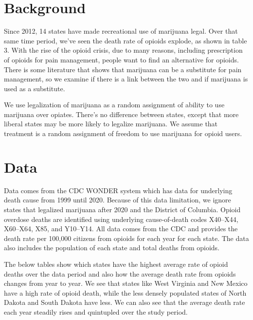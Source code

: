 \documentclass{article}
\begin{document}
\section*{Background} %

Since 2012, 14 states have made recreational use of marijuana legal. Over that same time period, we've seen the death rate of opioids explode, as shown in table 3. With the rise of the opioid crisis, due to many reasons, including prescription of opioids for pain management, people want to find an alternative for opioids. There is some literature that shows that marijuana can be a substitute for pain management, so we examine if there is a link between the two and if marijuana is used as a substitute. 

We use legalization of marijuana as a random assignment of ability to use marijuana over opiates. There's no difference between states, except that more liberal states may be more likely to legalize marijuana. We assume that treatment is a random assignment of freedom to use marijuana for opioid users. 





\section*{Data} %

Data comes from the CDC WONDER system which has data for underlying death cause from 1999 until 2020. Because of this data limitation, we ignore states that legalized marijuana after 2020 and the District of Columbia. Opioid overdose deaths are identified using underlying cause-of-death codes X40–X44, X60–X64, X85, and Y10–Y14. All data comes from the CDC and provides the death rate per 100,000 citizens from opioids for each year for each state. The data also includes the population of each state and total deaths from opioids. 

The below tables show which states have the highest average rate of opioid deaths over the data period and also how the average death rate from opioids changes from year to year. We see that states like West Virginia and New Mexico have a high rate of opioid death, while the less densely populated states of North Dakota and South Dakota have less. We can also see that the average death rate each year steadily rises and quintupled over the study period. 
\end{document}
